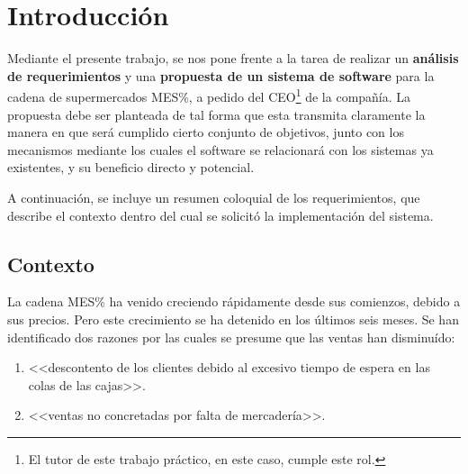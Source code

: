 
\section{Introducción}

Mediante el presente trabajo, se nos pone frente a la tarea de realizar un
\textbf{análisis de requerimientos} y una \textbf{propuesta de un sistema de
software} para la cadena de supermercados MES\%, a pedido del CEO\footnote{El
tutor de este trabajo práctico, en este caso, cumple este rol.} de la compañía.
La propuesta debe ser planteada de tal forma que esta transmita claramente la
manera en que será cumplido cierto conjunto de objetivos, junto con los
mecanismos mediante los cuales el software se relacionará con los sistemas ya
existentes, y su beneficio directo y potencial.

A continuación, se incluye un resumen coloquial de los requerimientos, que
describe el contexto dentro del cual se solicitó la implementación del sistema.

\subsection{Contexto}

La cadena MES\% ha venido creciendo rápidamente desde sus comienzos, debido a
sus precios. Pero este crecimiento se ha detenido en los últimos seis meses. Se
han identificado dos razones por las cuales se presume que las ventas han
disminuído: 
\begin{enumerate}
  \item <<descontento de los clientes debido al excesivo tiempo de espera 
  en las colas de las cajas>>.
  \item <<ventas no concretadas por falta de mercadería>>.
\end{enumerate}

